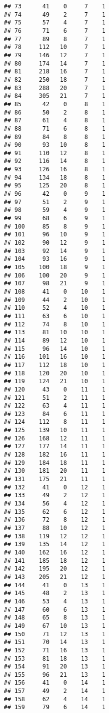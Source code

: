 \documentclass[
]{article}
\begin{document}
\begin{verbatim}
## 73      41    0     7    1
## 74      49    2     7    1
## 75      57    4     7    1
## 76      71    6     7    1
## 77      89    8     7    1
## 78     112   10     7    1
## 79     146   12     7    1
## 80     174   14     7    1
## 81     218   16     7    1
## 82     250   18     7    1
## 83     288   20     7    1
## 84     305   21     7    1
## 85      42    0     8    1
## 86      50    2     8    1
## 87      61    4     8    1
## 88      71    6     8    1
## 89      84    8     8    1
## 90      93   10     8    1
## 91     110   12     8    1
## 92     116   14     8    1
## 93     126   16     8    1
## 94     134   18     8    1
## 95     125   20     8    1
## 96      42    0     9    1
## 97      51    2     9    1
## 98      59    4     9    1
## 99      68    6     9    1
## 100     85    8     9    1
## 101     96   10     9    1
## 102     90   12     9    1
## 103     92   14     9    1
## 104     93   16     9    1
## 105    100   18     9    1
## 106    100   20     9    1
## 107     98   21     9    1
## 108     41    0    10    1
## 109     44    2    10    1
## 110     52    4    10    1
## 111     63    6    10    1
## 112     74    8    10    1
## 113     81   10    10    1
## 114     89   12    10    1
## 115     96   14    10    1
## 116    101   16    10    1
## 117    112   18    10    1
## 118    120   20    10    1
## 119    124   21    10    1
## 120     43    0    11    1
## 121     51    2    11    1
## 122     63    4    11    1
## 123     84    6    11    1
## 124    112    8    11    1
## 125    139   10    11    1
## 126    168   12    11    1
## 127    177   14    11    1
## 128    182   16    11    1
## 129    184   18    11    1
## 130    181   20    11    1
## 131    175   21    11    1
## 132     41    0    12    1
## 133     49    2    12    1
## 134     56    4    12    1
## 135     62    6    12    1
## 136     72    8    12    1
## 137     88   10    12    1
## 138    119   12    12    1
## 139    135   14    12    1
## 140    162   16    12    1
## 141    185   18    12    1
## 142    195   20    12    1
## 143    205   21    12    1
## 144     41    0    13    1
## 145     48    2    13    1
## 146     53    4    13    1
## 147     60    6    13    1
## 148     65    8    13    1
## 149     67   10    13    1
## 150     71   12    13    1
## 151     70   14    13    1
## 152     71   16    13    1
## 153     81   18    13    1
## 154     91   20    13    1
## 155     96   21    13    1
## 156     41    0    14    1
## 157     49    2    14    1
## 158     62    4    14    1
## 159     79    6    14    1

\end{verbatim}
\end{document}
